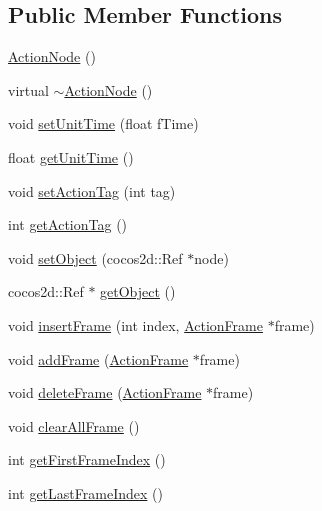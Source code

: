 \subsection*{Public Member Functions}
\begin{DoxyCompactItemize}
\item 
\hyperlink{classcocostudio_1_1ActionNode_ab5f8fd09d1d0942161155f6dc4007b3a}{Action\+Node} ()
\item 
virtual \hyperlink{classcocostudio_1_1ActionNode_a91a409b4ec811f0f481f8838777d3a77}{$\sim$\+Action\+Node} ()
\item 
void \hyperlink{classcocostudio_1_1ActionNode_acd7aacf5c0b22f3d9eee8a7504c8b852}{set\+Unit\+Time} (float f\+Time)
\item 
float \hyperlink{classcocostudio_1_1ActionNode_a26e826ff6e9e705b81fe59a25a938367}{get\+Unit\+Time} ()
\item 
void \hyperlink{classcocostudio_1_1ActionNode_abf63180dfd8e03e98dbfb679f55edfcf}{set\+Action\+Tag} (int tag)
\item 
int \hyperlink{classcocostudio_1_1ActionNode_aa444087ebd76949143dcb9adad98dc93}{get\+Action\+Tag} ()
\item 
void \hyperlink{classcocostudio_1_1ActionNode_a77ead6b033989a2e51daf494baa6df86}{set\+Object} (cocos2d\+::\+Ref $\ast$node)
\item 
cocos2d\+::\+Ref $\ast$ \hyperlink{classcocostudio_1_1ActionNode_a31e2f62798eb18f0e09c270688fb6e3d}{get\+Object} ()
\item 
void \hyperlink{classcocostudio_1_1ActionNode_a878d16c3aee4203fddf6891f90f9bc8d}{insert\+Frame} (int index, \hyperlink{classcocostudio_1_1ActionFrame}{Action\+Frame} $\ast$frame)
\item 
void \hyperlink{classcocostudio_1_1ActionNode_a982d01cb4931e108f5d02bf3cc6ec9c3}{add\+Frame} (\hyperlink{classcocostudio_1_1ActionFrame}{Action\+Frame} $\ast$frame)
\item 
void \hyperlink{classcocostudio_1_1ActionNode_a5b671d485ec7f81f5012ca6d7fa73aa5}{delete\+Frame} (\hyperlink{classcocostudio_1_1ActionFrame}{Action\+Frame} $\ast$frame)
\item 
void \hyperlink{classcocostudio_1_1ActionNode_aecb985671dc22f4e3beecadbd63badd9}{clear\+All\+Frame} ()
\item 
int \hyperlink{classcocostudio_1_1ActionNode_acd66f401500fc2dc3bbe561f5b58f177}{get\+First\+Frame\+Index} ()
\item 
int \hyperlink{classcocostudio_1_1ActionNode_a4f5f69fc0b097ab421ce518b10f316c1}{get\+Last\+Frame\+Index} ()

\end{DoxyCompactItemize}
